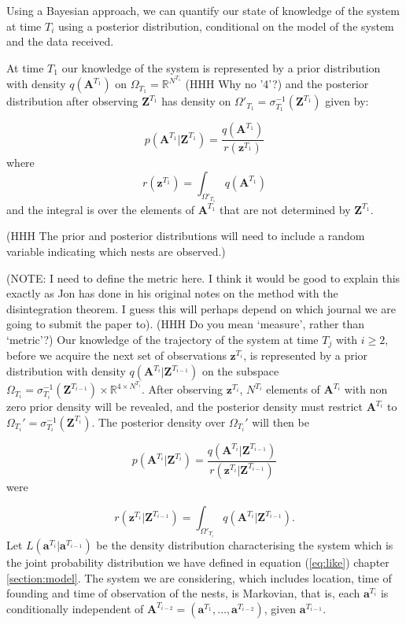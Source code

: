 \documentclass{article}
\renewcommand{\vec}[1]{\mathbf{#1}}
\begin{document}
Using a Bayesian approach, we can quantify our state of knowledge of the system at time $T_i$ using a posterior distribution, conditional on the model of the system and the data received.

At time $T_1$ our knowledge of the system is represented by a prior distribution with density $q(\vec{A}^{T_1})$ on $\Omega_{T_1} = \mathbb{R}^{N^{T_1}}$ (HHH Why no '4'?) and the posterior distribution after observing $\vec{Z}^{T_1}$ has density on $\Omega'_{T_1} = \sigma_{T_1}^{-1}(\vec{Z}^{T_1})$ given by:

\begin{equation*}
    p(\vec{A}^{T_1} | \vec{Z}^{T_1}) = \frac{q(\vec{A}^{T_1})}{r(\vec{z}^{T_1})}
\end{equation*}
where
\begin{equation*}
    r(\vec{z}^{T_1}) = \int_{\Omega'_{T_1}} q(\vec{A}^{T_1}) 
\end{equation*}
and the integral is over the elements of $\vec{A}^{T_1}$ that are not determined by $\vec{Z}^{T_1}$.

(HHH The prior and posterior distributions will need to include a random variable indicating which nests are observed.)

(NOTE: I need to define the metric here. I think it would be good to explain this exactly as Jon has done in his original notes on the method with the disintegration theorem. I guess this will perhaps depend on which journal we are going to submit the paper to). (HHH Do you mean `measure', rather than `metric'?)
Our knowledge of the trajectory of the system at time $T_j$ with $i \geq 2$, before we acquire the next set of observations $\vec{z}^{T_i}$, is represented by a prior distribution with density $q(\vec{A}^{T_i} | \vec{Z}^{T_{i-1}})$ on the subspace $\Omega_{T_i} = \sigma_{T_i}^{-1} (\vec{Z}^{T_{i-1}}) \times \mathbb{R}^{4 \times N^{T_i}}$. After observing $\vec{z}^{T_i}$, $N^{T_i}$ elements of $\vec{A}^{T_i}$ with non zero prior density will be revealed, and the posterior density must restrict $\vec{A}^{T_i}$ to $\Omega_{T_i}' = \sigma_{T_i}^{-1}(\vec{Z}^{T_i})$. The posterior density over $\Omega_{T_i}'$ will then be

\begin{equation*}
    p(\vec{A}^{T_i} | \vec{Z}^{T_i}) = \frac{q(\vec{A}^{T_i} | \vec{Z}^{T_{i-1}})}{r(\vec{z}^{T_i} | \vec{Z}^{T_{i-1}})}
\end{equation*}
were

\begin{equation*}
    r(\vec{z}^{T_i} | \vec{Z}^{T_{i-1}}) = \int_{\Omega'_{T_i}} q(\vec{A}^{T_i} | \vec{Z}^{T_{i-1}}).
\end{equation*}
Let $L(\vec{a}^{T_i} | \vec{a}^{T_{i-1}})$ be the density distribution characterising the system which is the joint probability distribution we have defined in equation (\ref{eq:like}) chapter  \ref{section:model}. The system we are considering, which includes location, time of founding and time of observation of the nests, is Markovian, that is, each $\vec{a}^{T_i}$ is conditionally independent of $\vec{A}^{T_{i-2}} = (\vec{a}^{T_1}, \ldots,\vec{a}^{T_{i-2}})$, given $\vec{a}^{T_{i-1}}$.
\end{document}
